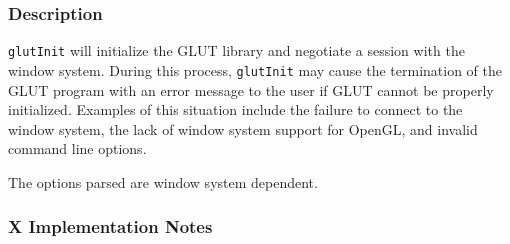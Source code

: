 \subsubsection*{Description}

{\tt glutInit} will initialize the GLUT library and negotiate a session with the window
system.  During this process, {\tt glutInit}
may cause the termination of the GLUT program with an error message to the user if GLUT
cannot be properly initialized.  Examples of this situation include the failure to
connect to the window system, the lack of window system support for OpenGL, and invalid
command line options.

The options parsed are window system dependent.

\subsubsection*{X Implementation Notes}

